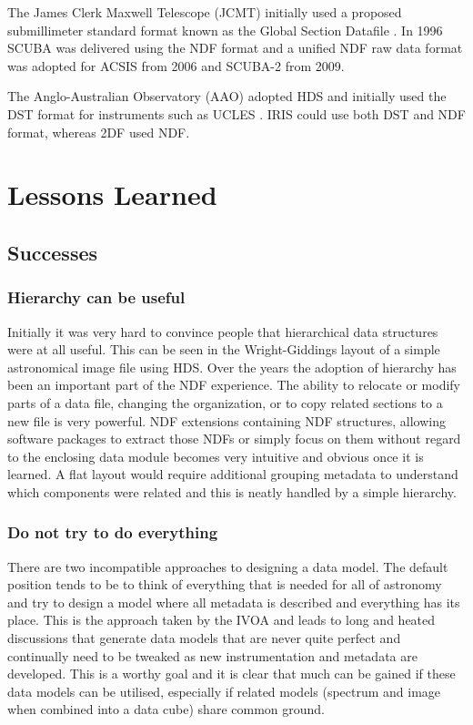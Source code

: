 \documentclass[final,authoryear,5p,times,twocolumn]{elsarticle}
\begin{document}
The James Clerk Maxwell Telescope (JCMT) initially used a proposed
submillimeter standard format known as the Global Section Datafile
\citep[GSD;][formerly General Single Dish Data]{sun229}. In 1996 SCUBA
\citep{1999MNRAS.303..659H} was delivered using the NDF format and a
unified NDF raw data format was adopted for ACSIS
\citep{2009MNRAS.399.1026B} from 2006 and SCUBA-2
\citep{2013MNRAS.430.2513H} from 2009.

The Anglo-Australian Observatory (AAO) adopted HDS and initially used
the DST format for instruments such as UCLES
\citep{1990SPIE.1235..562D}. IRIS \citep{1993PASAu..10..298A} could
use both DST and NDF format, whereas 2DF \citep{2002MNRAS.333..279L}
used NDF.

\section{Lessons Learned}
\label{sec:lessons}

\subsection{Successes}
\label{sec:success}

\subsubsection{Hierarchy can be useful}

Initially it was very hard to convince people that hierarchical data
structures were at all useful. This can be seen in the Wright-Giddings
layout of a simple astronomical image file using HDS. Over the years
the adoption of hierarchy has been an important part of the NDF
experience. The ability to relocate or modify parts of a data file,
changing the organization, or to copy related sections to a new file
is very powerful.  NDF extensions containing NDF structures, allowing
software packages to extract those NDFs or simply focus on them
without regard to the enclosing data module becomes very intuitive and
obvious once it is learned. A flat layout would require additional
grouping metadata to understand which components were related and this
is neatly handled by a simple hierarchy.

\subsubsection{Do not try to do everything}

There are two incompatible approaches to designing a data model. The
default position tends to be to think of everything that is needed for
all of astronomy and try to design a model where all metadata is
described and everything has its place. This is the approach taken by
the IVOA \citep[see e.g.][]{2012arXiv1204.3055M} and leads to long and
heated discussions that generate data models that are never quite
perfect and continually need to be tweaked as new instrumentation and
metadata are developed. This is a worthy goal and it is clear that
much can be gained if these data models can be utilised, especially if
related models (spectrum and image when combined into a data cube)
share common ground.
\end{document}
